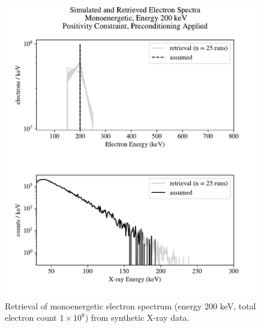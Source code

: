 \begin{figure}[p]
    \centering
    \includegraphics[width=\textwidth]{figures/chapter_4/synthetic_data_examples/mono_200keV_posonly_preconditioning_1e8_particles}
    \caption{Retrieval of monoenergetic electron spectrum (energy 200 keV, total electron count $1\times10^8$) from synthetic X-ray data.}
    \label{why_non_negative_is_good}
\end{figure}

